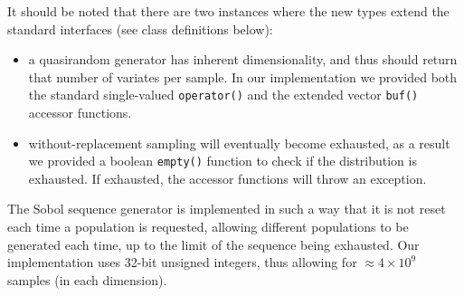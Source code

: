 \documentclass[]{article}
\begin{document}
It should be noted that there are two instances where the new types
extend the standard interfaces (see class definitions below):

\begin{itemize}
\item
  a quasirandom generator has inherent dimensionality, and thus should
  return that number of variates per sample. In our implementation we
  provided both the standard single-valued \texttt{operator()} and the
  extended vector \texttt{buf()} accessor functions.
\item
  without-replacement sampling will eventually become exhausted, as a
  result we provided a boolean \texttt{empty()} function to check if the
  distribution is exhausted. If exhausted, the accessor functions will
  throw an exception.
\end{itemize}

The Sobol sequence generator is implemented in such a way that it is not reset
each time a population is requested, allowing different populations to
be generated each time, up to the limit of the sequence being exhausted.
Our implementation uses 32-bit unsigned integers, thus allowing for
\(\approx4\times10^9\) samples (in each dimension).
\end{document}
